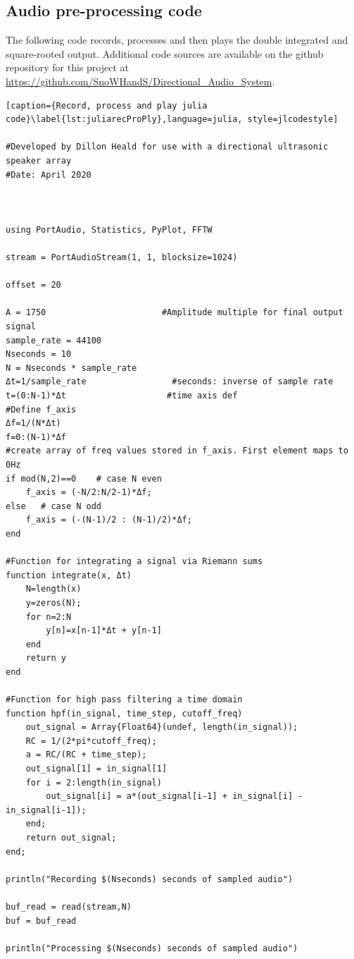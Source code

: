 \appendix
\begin{appendices}
\section{Audio pre-processing code}


The following code records, processes and then plays the double integrated and square-rooted output. Additional code sources are available on the github repository for this project at \url{https://github.com/SnoWHandS/Directional_Audio_System}.

\begin{lstlisting}[caption={Record, process and play julia code}\label{lst:juliarecProPly},language=julia, style=jlcodestyle]

#Developed by Dillon Heald for use with a directional ultrasonic speaker array
#Date: April 2020



using PortAudio, Statistics, PyPlot, FFTW

stream = PortAudioStream(1, 1, blocksize=1024)

offset = 20

A = 1750                       #Amplitude multiple for final output signal
sample_rate = 44100
Nseconds = 10
N = Nseconds * sample_rate
Δt=1/sample_rate                 #seconds: inverse of sample rate
t=(0:N-1)*Δt                    #time axis def
#Define f_axis
Δf=1/(N*Δt)
f=0:(N-1)*Δf
#create array of freq values stored in f_axis. First element maps to 0Hz
if mod(N,2)==0    # case N even
    f_axis = (-N/2:N/2-1)*Δf;    
else   # case N odd
    f_axis = (-(N-1)/2 : (N-1)/2)*Δf; 
end

#Function for integrating a signal via Riemann sums
function integrate(x, Δt)
    N=length(x)
    y=zeros(N);
    for n=2:N
        y[n]=x[n-1]*Δt + y[n-1]
    end
    return y
end

#Function for high pass filtering a time domain
function hpf(in_signal, time_step, cutoff_freq)
    out_signal = Array{Float64}(undef, length(in_signal));
    RC = 1/(2*pi*cutoff_freq);
    a = RC/(RC + time_step);
    out_signal[1] = in_signal[1]
    for i = 2:length(in_signal)
        out_signal[i] = a*(out_signal[i-1] + in_signal[i] - in_signal[i-1]);
    end;
    return out_signal;
end;

println("Recording $(Nseconds) seconds of sampled audio")

buf_read = read(stream,N)
buf = buf_read

println("Processing $(Nseconds) seconds of sampled audio")


\end{lstlisting}
\end{appendices}
